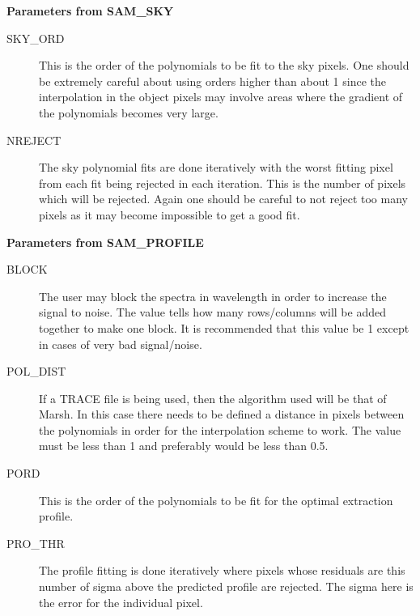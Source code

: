 {\bf Parameters from SAM\_SKY}

\begin{description}
\begin{description}

\item[SKY\_ORD] This is the order of the polynomials to be fit to the sky
pixels.  One should be extremely careful about using orders higher than about
1 since the interpolation in the object pixels may involve areas where the
gradient of the polynomials becomes very large.

\item[NREJECT]  The sky polynomial fits are done iteratively with the worst
fitting pixel from each fit being rejected in each iteration.  This is the 
number of pixels which will be rejected.  Again one should be careful to not
reject too many pixels as it may become impossible to get a good fit.

\end{description}
\end{description}

{\bf Parameters from SAM\_PROFILE}

\begin{description}
\begin{description}

\item[BLOCK] The user may block the spectra in wavelength in order to increase
the signal to noise.  The value tells how many rows/columns will be added 
together to make one block. It is recommended that this value be 1 except in
cases of very bad signal/noise.

\item[POL\_DIST]  If a TRACE file is being used, then the algorithm used will
be that of Marsh.  In this case there needs to be defined a distance in pixels
between the polynomials in order for the interpolation scheme to work.  The
value must be less than 1 and preferably would be less than 0.5.

\item[PORD] This is the order of the polynomials to be fit for the optimal
extraction profile.

\item[PRO\_THR]  The profile fitting is done iteratively where pixels whose
residuals are this number of sigma above the predicted profile are rejected.
The sigma here is the error for the individual pixel. 

\end{description}
\end{description}

